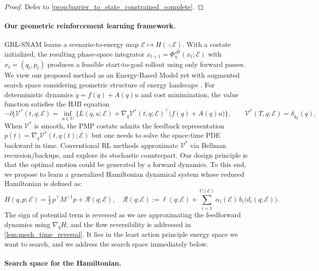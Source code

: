 \begin{proof}
Defer to \cref{prop:barrier_to_state_constrained_complete}.
\end{proof}

\paragraph{Our geometric reinforcement learning framework.}

GRL-SNAM {learns} a scenario-to-energy map $\mathcal E\mapsto H(\cdot;\mathcal E)$. With a costate initialized, the resulting phase-space integrator
$x_{t+1}=\Phi_{\eta}^{\Delta t}(x_t;\mathcal E)$ with $x_t=(q_t,p_t)$ produces a feasible start-to-goal rollout using only forward passes. We view our proposed method as an Energy-Based Model \citep{hopfield1982neural,ackley1985learning,lecun2006tutorial} yet with augmented search space considering geometric structure of energy landscape \citep{nguyen2025stochastic, ryan2025bayesian, mclennan2025learning}. For deterministic dynamics $\dot q=f(q)+A(q)u$ and cost minimization, the value function satisfies the HJB equation
\[
-\partial_t \mathcal V^{*}(t,q;\mathcal E)
=\inf_{u\in U}\Big\{L(q,u;\mathcal E)+\nabla_q\mathcal V^{*}(t,q;\mathcal E)^\top\big(f(q)+A(q)u\big)\Big\},
\qquad
\mathcal V^{*}(T,q;\mathcal E)=\delta_{q_T}(q).
\]
When $\mathcal V^{*}$ is smooth, the PMP costate admits the feedback representation
$p(t)=\nabla_q\mathcal V^{*}(t,q(t);\mathcal E)$ but one needs to solve the space-time PDE backward in time.
Conventional RL methods approximate $\mathcal V^{*}$ via Bellman recursion/backups, and explore its stochastic counterpart. Our design principle is that the optimal motion could be generated by a forward dynamics. To this end, we propose to learn a generalized Hamiltonian dynamical system whose reduced Hamiltonian is defined as:
\begin{equation}
\label{eq:def:reduced:hamiltonian:grl-snam}
H(q,p;\mathcal E)
=\tfrac12\,p^\top M^{-1}p + \mathcal{R}(q;\mathcal E),
\quad
\mathcal{R}(q;\mathcal E)
:= \ell(q;\mathcal E)+\sum_{i=1}^{C(\mathcal E)} \alpha_i(\mathcal E)\, b_i\!\big(d_i(q;\mathcal E)\big).
\end{equation}
The sign of potential term is reversed as we are approximating the feedforward dynamics using $\nabla_q H$, and the flow reversibility is addressed in \cref{lem:mech_time_reversal}. It lies in the least action principle energy space we want to search, and we address the search space immediately below. 


\paragraph{Search space for the Hamiltonian.}

